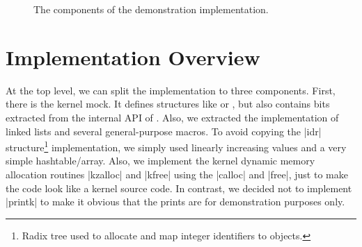 \begin{figure}
	\centering
	\caption[Components of the demonstrator]{The components of the demonstration implementation.}
	\label{fig:mat-comps}
\end{figure}

\section{Implementation Overview}

At the top level, we can split the implementation to three components. First,
there is the kernel mock. It defines structures like \skb{} or \netdev{}, but
also contains bits extracted from the internal API of . Also, we
extracted the implementation of linked lists and several general-purpose
macros. To avoid copying the \struct|idr| structure\footnote{Radix tree used to
allocate and map integer identifiers to objects.} implementation, we simply
used linearly increasing values and a very simple hashtable/array. Also, we
implement the kernel dynamic memory allocation routines \fnc|kzalloc| and
\fnc|kfree| using the  \fnc|calloc| and \fnc|free|, just to make the
code look like a kernel source code. In contrast, we decided not to implement
\fnc|printk| to make it obvious that the prints are for demonstration purposes
only.

